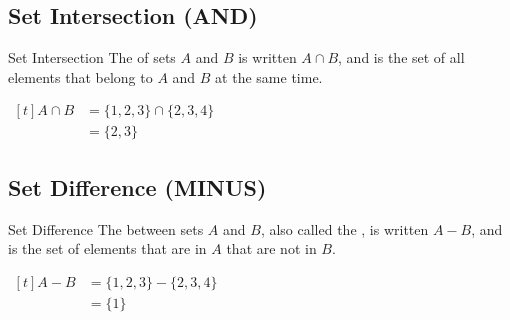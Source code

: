 \documentclass[\main/notes.tex]{subfiles}
\begin{document}
			\subsection[Set Intersection]{Set Intersection (AND)}
				\begin{definition}{Set Intersection}
					The  of sets $A$ and $B$ is written $A \cap  B$, and is the set of all elements that belong to $A$ and $B$ at the same time.
				\end{definition}
				\nopagebreak
				\begin{center}
					\begin{venntwo}[][$A \cap B = \bigl\{x \mid x \in A$ and $x \in B\bigr\}$]
						\fillACapB
					\end{venntwo}
				\end{center}
				\begin{example}[hbox] $
					\begin{aligned}[t]
						A \cap B &= \{1, 2, 3\} \cap \{2, 3, 4\}\\
						&= \{2, 3\}
					\end{aligned} $
				\end{example}

			\subsection[Set Difference]{Set Difference (MINUS)}
				\begin{definition}{Set Difference}
					The  between sets $A$ and $B$, also called the , is written $A - B$, and is the set of elements that are in $A$ that are not in $B$.
				\end{definition}
				\nopagebreak
				\begin{center}
					\begin{venntwo}[][$A - B = \bigl\{x \mid x \in A$ and $x \notin B\bigr\}$]
						\fillOnlyA
					\end{venntwo}
				\end{center}
				\begin{example}[hbox] $
					\begin{aligned}[t]
						A - B &= \{1, 2, 3\} - \{2, 3, 4\}\\
						&= \{1\}
					\end{aligned} $
				\end{example}
\end{document}
